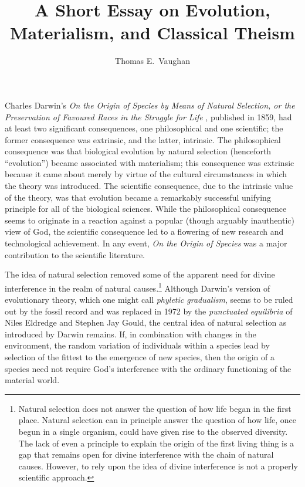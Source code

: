 \documentclass[twocolumn]{article}
\title{A Short Essay on Evolution, Materialism, and Classical Theism}
\author{Thomas E.~Vaughan}
\begin{document}
\maketitle

Charles Darwin's {\it%
   On the Origin of Species by Means of Natural Selection, or the Preservation
   of Favoured Races in the Struggle for Life%
},
published in 1859, had at least two significant consequences, one philosophical
and one scientific; the former consequence was extrinsic, and the latter,
intrinsic. The philosophical consequence was that biological evolution by
natural selection (henceforth ``evolution'') became associated with
materialism; this consequence was extrinsic because it came about merely by
virtue of the cultural circumstances in which the theory was introduced. The
scientific consequence, due to the intrinsic value of the theory, was that
evolution became a remarkably successful unifying principle for all of the
biological sciences. While the philosophical consequence seems to originate in
a reaction against a popular (though arguably inauthentic) view of God, the
scientific consequence led to a flowering of new research and technological
achievement. In any event, {\it On the Origin of Species\/} was a major
contribution to the scientific literature.

The idea of natural selection removed some of the apparent need for divine
interference in the realm of natural causes.\footnote{%
   Natural selection does not answer the question of how life began in the
   first place. Natural selection can in principle answer the question of how
   life, once begun in a single organism, could have given rise to the observed
   diversity. The lack of even a principle to explain the origin of the first
   living thing is a gap that remains open for divine interference with the
   chain of natural causes. However, to rely upon the idea of divine
   interference is not a properly scientific approach.
}
Although Darwin's version of evolutionary theory, which one might call
\emph{phyletic gradualism}, seems to be ruled out by the fossil record and was
replaced in 1972 by the \emph{punctuated equilibria} of Niles Eldredge and
Stephen Jay Gould, the central idea of natural selection as introduced by
Darwin remains.  If, in combination with changes in the environment, the random
variation of individuals within a species lead by selection of the fittest to
the emergence of new species, then the origin of a species need not require
God's interference with the ordinary functioning of the material world.
\end{document}
